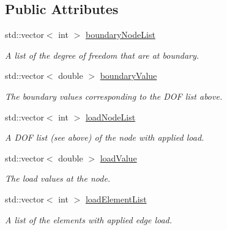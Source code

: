 \subsection*{Public Attributes}
\begin{DoxyCompactItemize}
\item 
std\+::vector$<$ int $>$ \mbox{\hyperlink{class_mesh_a5a1c5739ef85c8f9071f689e790b5251}{boundary\+Node\+List}}
\begin{DoxyCompactList}\small\item\em A list of the degree of freedom that are at boundary. \end{DoxyCompactList}\item 
\mbox{\label{class_mesh_ab331f3e3efeb2934c202b07db8a6c1a5}} 
std\+::vector$<$ double $>$ \mbox{\hyperlink{class_mesh_ab331f3e3efeb2934c202b07db8a6c1a5}{boundary\+Value}}
\begin{DoxyCompactList}\small\item\em The boundary values corresponding to the D\+OF list above. \end{DoxyCompactList}\item 
\mbox{\label{class_mesh_ad54254084b97877bb4d0f9d9d9cbb380}} 
std\+::vector$<$ int $>$ \mbox{\hyperlink{class_mesh_ad54254084b97877bb4d0f9d9d9cbb380}{load\+Node\+List}}
\begin{DoxyCompactList}\small\item\em A D\+OF list (see above) of the node with applied load. \end{DoxyCompactList}\item 
\mbox{\label{class_mesh_a688adb457f52ffa939f53f22afae697e}} 
std\+::vector$<$ double $>$ \mbox{\hyperlink{class_mesh_a688adb457f52ffa939f53f22afae697e}{load\+Value}}
\begin{DoxyCompactList}\small\item\em The load values at the node. \end{DoxyCompactList}\item 
\mbox{\label{class_mesh_a233cbdf434a8afb904b97ad803ae6daf}} 
std\+::vector$<$ int $>$ \mbox{\hyperlink{class_mesh_a233cbdf434a8afb904b97ad803ae6daf}{load\+Element\+List}}
\begin{DoxyCompactList}\small\item\em A list of the elements with applied edge load. \end{DoxyCompactList}\item 

\end{DoxyCompactItemize}
